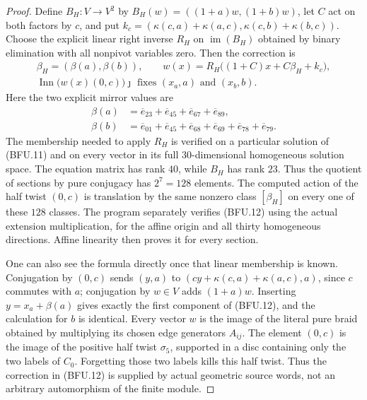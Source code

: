 \begin{proof}
Define $B_H:V\to V^2$ by
$B_H(w)=((1+a)w,(1+b)w)$, let $C$ act on both factors
by $c$, and put
$k_c=(\kappa(c,a)+\kappa(a,c),
       \kappa(c,b)+\kappa(b,c))$.
Choose the explicit linear right inverse $R_H$ on
$\operatorname{im}(B_H)$ obtained by binary elimination
with all nonpivot variables zero.  Then the correction is
\[
\begin{gathered}
 \beta_H=(\beta(a),\beta(b)),\qquad
 w(x)=R_H\bigl((1+C)x+C\beta_H+k_c\bigr),\\
 \operatorname{Inn}\bigl(w(x)(0,c)\bigr)\jmath
       \text{ fixes }(x_a,a)\text{ and }(x_b,b).
\end{gathered}                                                  \tag{BFU.12}
\]
Here the two explicit mirror values are
\[
\begin{aligned}
 \beta(a)&=\overline e_{23}+\overline e_{45}
                       +\overline e_{67}+\overline e_{89},\\
 \beta(b)&=\overline e_{01}+\overline e_{45}
       +\overline e_{68}+\overline e_{69}
       +\overline e_{78}+\overline e_{79}.
\end{aligned}                                                   \tag{BFU.13}
\]
The membership needed to apply $R_H$ is verified on a
particular solution of (BFU.11) and on every vector in
its full $30$-dimensional homogeneous solution space.
The equation matrix has rank $40$, while $B_H$ has rank
$23$.  Thus the quotient of sections by pure conjugacy
has $2^7=128$ elements.  The computed action of the
half twist $(0,c)$ is translation by the same nonzero
class $[\beta_H]$ on every one of these $128$ classes.
The program separately verifies (BFU.12) using the actual
extension multiplication, for the affine origin and all
thirty homogeneous directions.  Affine linearity then
proves it for every section.

One can also see the formula directly once that linear
membership is known.  Conjugation by $(0,c)$ sends
$(y,a)$ to
$(cy+\kappa(c,a)+\kappa(a,c),a)$, since $c$ commutes
with $a$; conjugation by $w\in V$ adds $(1+a)w$.
Inserting $y=x_a+\beta(a)$ gives exactly the first
component of (BFU.12), and the calculation for $b$ is
identical.  Every vector $w$ is the image of the literal
pure braid obtained by multiplying its chosen edge
generators $A_{ij}$.  The element $(0,c)$ is the image
of the positive half twist $\sigma_5$, supported in a
disc containing only the two labels of $C_0$.  Forgetting
those two labels kills this half twist.  Thus the
correction in (BFU.12) is supplied by actual geometric
source words, not an arbitrary automorphism of the
finite module.


\end{proof}
